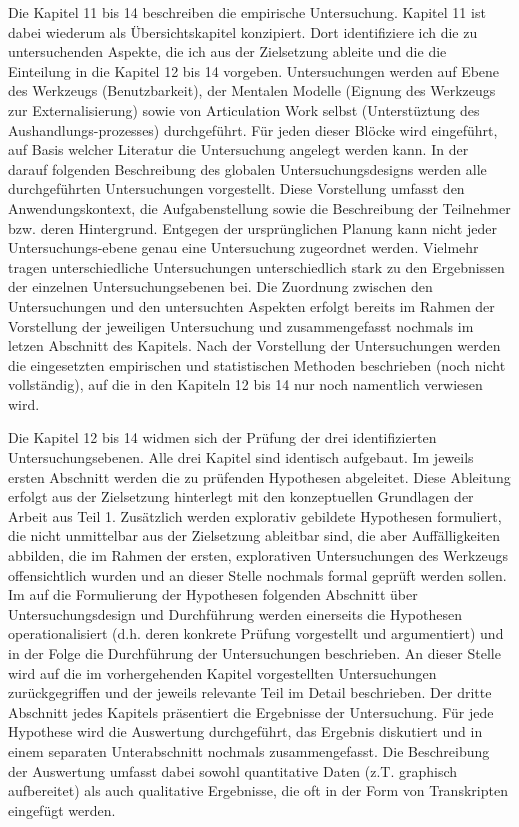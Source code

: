 \todo Die Kapitel 11 bis 14 beschreiben die empirische Untersuchung. Kapitel 11 ist dabei wiederum als Übersichtskapitel konzipiert. Dort identifiziere ich die zu untersuchenden Aspekte, die ich aus der Zielsetzung ableite und die die Einteilung in die Kapitel 12 bis 14 vorgeben. Untersuchungen werden auf Ebene des Werkzeugs (Benutzbarkeit), der Mentalen Modelle (Eignung des Werkzeugs zur Externalisierung) sowie von Articulation Work selbst (Unterstüztung des Aushandlungs-prozesses) durchgeführt. Für jeden dieser Blöcke wird eingeführt, auf Basis welcher Literatur die Untersuchung angelegt werden kann. In der darauf folgenden Beschreibung des globalen Untersuchungsdesigns werden alle durchgeführten Untersuchungen vorgestellt. Diese Vorstellung umfasst den Anwendungskontext, die Aufgabenstellung sowie die Beschreibung der Teilnehmer bzw. deren Hintergrund. Entgegen der ursprünglichen Planung kann nicht jeder Untersuchungs-ebene genau eine Untersuchung zugeordnet werden. Vielmehr tragen unterschiedliche Untersuchungen unterschiedlich stark zu den Ergebnissen der einzelnen Untersuchungsebenen bei. Die Zuordnung zwischen den Untersuchungen und den untersuchten Aspekten erfolgt bereits im Rahmen der Vorstellung der jeweiligen Untersuchung und zusammengefasst nochmals im letzen Abschnitt des Kapitels. Nach der Vorstellung der Untersuchungen werden die eingesetzten empirischen und statistischen Methoden beschrieben (noch nicht vollständig), auf die in den Kapiteln 12 bis 14 nur noch namentlich verwiesen wird.

\todo Die Kapitel 12 bis 14 widmen sich der Prüfung der drei identifizierten Untersuchungsebenen. Alle drei Kapitel sind identisch aufgebaut. Im jeweils ersten Abschnitt werden die zu prüfenden Hypothesen abgeleitet. Diese Ableitung erfolgt aus der Zielsetzung hinterlegt mit den konzeptuellen Grundlagen der Arbeit aus Teil 1. Zusätzlich werden explorativ gebildete Hypothesen formuliert, die nicht unmittelbar aus der Zielsetzung ableitbar sind, die aber Auffälligkeiten abbilden, die im Rahmen der ersten, explorativen Untersuchungen des Werkzeugs offensichtlich wurden und an dieser Stelle nochmals formal geprüft werden sollen. Im auf die Formulierung der Hypothesen folgenden Abschnitt über Untersuchungsdesign und Durchführung werden einerseits die Hypothesen operationalisiert (d.h. deren konkrete Prüfung vorgestellt und argumentiert) und in der Folge die Durchführung der Untersuchungen beschrieben. An dieser Stelle wird auf die im vorhergehenden Kapitel vorgestellten Untersuchungen zurückgegriffen und der jeweils relevante Teil im Detail beschrieben. Der dritte Abschnitt jedes Kapitels präsentiert die Ergebnisse der Untersuchung. Für jede Hypothese wird die Auswertung durchgeführt, das Ergebnis diskutiert und in einem separaten Unterabschnitt nochmals zusammengefasst. Die Beschreibung der Auswertung umfasst dabei sowohl quantitative Daten (z.T. graphisch aufbereitet) als auch qualitative Ergebnisse, die oft in der Form von Transkripten eingefügt werden.


